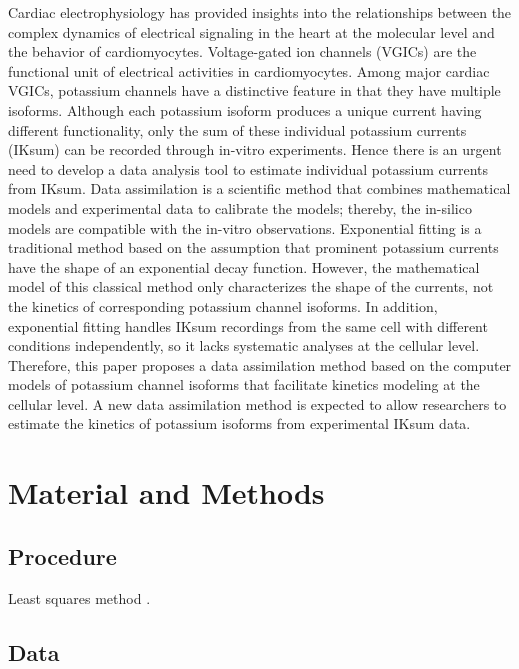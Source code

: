 \documentclass[utf8]{frontiersHLTH} %
\begin{document}
Cardiac electrophysiology has provided insights into the relationships between the complex dynamics of electrical signaling in the heart at the molecular level and the behavior of cardiomyocytes. Voltage-gated ion channels (VGICs) are the functional unit of electrical activities in cardiomyocytes. Among major cardiac VGICs, potassium channels have a distinctive feature in that they have multiple isoforms. Although each potassium isoform produces a unique current having different functionality, only the sum of these individual potassium currents (IKsum) can be recorded through in-vitro experiments. Hence there is an urgent need to develop a data analysis tool to estimate individual potassium currents from IKsum. Data assimilation is a scientific method that combines mathematical models and experimental data to calibrate the models; thereby, the in-silico models are compatible with the in-vitro observations. Exponential fitting is a traditional method based on the assumption that prominent potassium currents have the shape of an exponential decay function. However, the mathematical model of this classical method only characterizes the shape of the currents, not the kinetics of corresponding potassium channel isoforms. In addition, exponential fitting handles IKsum recordings from the same cell with different conditions independently, so it lacks systematic analyses at the cellular level. Therefore, this paper proposes a data assimilation method based on the computer models of potassium channel isoforms that facilitate kinetics modeling at the cellular level. A new data assimilation method is expected to allow researchers to estimate the kinetics of potassium isoforms from experimental IKsum data. 


\section{Material and Methods}
\subsection{Procedure}
Least squares method \cite{reali2017optimization}.

\subsection{Data}
\end{document}
